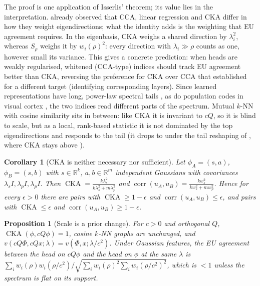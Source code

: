 \documentclass[twoside]{article}
\newtheorem{proposition}[theorem]{Proposition}
\newtheorem{corollary}[theorem]{Corollary}
\theoremstyle{definition}
\theoremstyle{remark}
\newcommand{\R}{\mathbb{R}}
\newcommand{\corr}{\operatorname{corr}}
\newcommand{\cka}{\operatorname{CKA}}
\newcommand{\Srho}{S_{\rho}}
\begin{document}
The proof is one application of Isserlis' theorem; its value lies in the interpretation.
\citet{kornblith2019similarity} already observed that CCA, linear regression and CKA differ in how they weight eigendirections; what the identity adds is the weighting that EU agreement requires. In the eigenbasis, CKA weighs a shared direction by $\lambda_i^2$, whereas $\Srho$ weighs it by $w_i(\rho)^2$: every direction with $\lambda_i\gg\rho$ counts as one, however small its variance.
This gives a concrete prediction: when heads are weakly regularised, whitened (CCA-type) indices should track EU agreement better than CKA, reversing the preference for CKA over CCA that \citet{kornblith2019similarity} established for a different target (identifying corresponding layers).
Since learned representations have long, power-law spectral tails \citep{agrawal2022alphareq}, as do population codes in visual cortex \citep{stringer2019highdim}, the two indices read different parts of the spectrum.
Mutual $k$-NN with cosine similarity sits in between: like CKA it is invariant to $cQ$, so it is blind to scale, but as a local, rank-based statistic it is not dominated by the top eigendirections and responds to the tail (it drops to \EtwobTailMKNNMin{} under the tail reshaping of , where CKA stays above \EtwobTailCKAMin{}).

\begin{corollary}[CKA is neither necessary nor sufficient]
\label{cor:neither}
Let $\phi_A=(s,a)$, $\phi_B=(s,b)$ with $s\in\R^k$, $a,b\in\R^m$ independent Gaussians with covariances $\lambda_s I,\lambda_pI,\lambda_pI$. Then
$\cka=\frac{k\lambda_s^2}{k\lambda_s^2+m\lambda_p^2}$ and
$\corr(u_A,u_B)=\frac{k w_s^2}{k w_s^2+m w_p^2}$.
Hence for every $\epsilon>0$ there are pairs with $\cka\ge 1-\epsilon$ and $\corr(u_A,u_B)\le\epsilon$, and pairs with $\cka\le\epsilon$ and $\corr(u_A,u_B)\ge1-\epsilon$.
\end{corollary}

\begin{proposition}[Scale is a prior change]
\label{prop:scale}
For $c>0$ and orthogonal $Q$, $\cka(\phi,cQ\phi)=1$, cosine $k$-NN graphs are unchanged, and $v(cQ\Phi,cQx;\lambda)=v(\Phi,x;\lambda/c^2)$.
Under Gaussian features, the EU agreement between the head on $cQ\phi$ and the head on $\phi$ at the same $\lambda$ is
$\sum_i w_i(\rho)w_i(\rho/c^2)\big/\sqrt{\sum_i w_i(\rho)^2\sum_i w_i(\rho/c^2)^2}$, which is $<1$ unless the spectrum is flat on its support.
\end{proposition}
\end{document}
